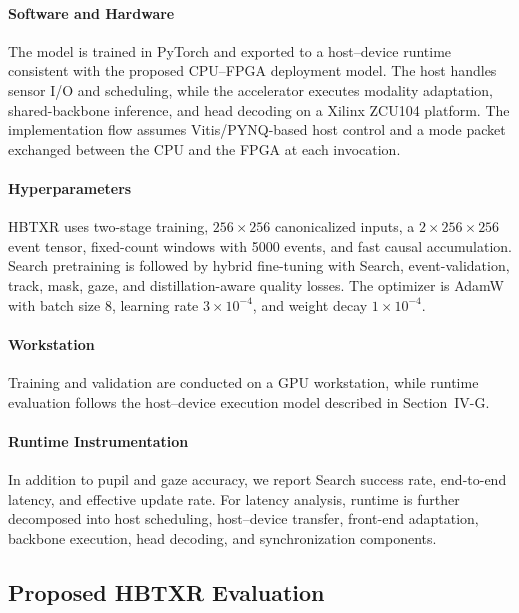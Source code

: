 \documentclass[journal]{IEEEtran}
\begin{document}
\paragraph*{Software and Hardware}
The model is trained in PyTorch and exported to a host--device runtime consistent with the proposed CPU--FPGA deployment model. The host handles sensor I/O and scheduling, while the accelerator executes modality adaptation, shared-backbone inference, and head decoding on a Xilinx ZCU104 platform. The implementation flow assumes Vitis/PYNQ-based host control and a mode packet exchanged between the CPU and the FPGA at each invocation.

\paragraph*{Hyperparameters}
HBTXR uses two-stage training, $256\times256$ canonicalized inputs, a $2\times256\times256$ event tensor, fixed-count windows with 5000 events, and fast causal accumulation. Search pretraining is followed by hybrid fine-tuning with Search, event-validation, track, mask, gaze, and distillation-aware quality losses. The optimizer is AdamW with batch size 8, learning rate $3\times10^{-4}$, and weight decay $1\times10^{-4}$.

\paragraph*{Workstation}
Training and validation are conducted on a GPU workstation, while runtime evaluation follows the host--device execution model described in Section~IV-G.

\paragraph*{Runtime Instrumentation}
In addition to pupil and gaze accuracy, we report Search success rate, end-to-end latency, and effective update rate. For latency analysis, runtime is further decomposed into host scheduling, host--device transfer, front-end adaptation, backbone execution, head decoding, and synchronization components.



\subsection{Proposed HBTXR Evaluation}
\end{document}
